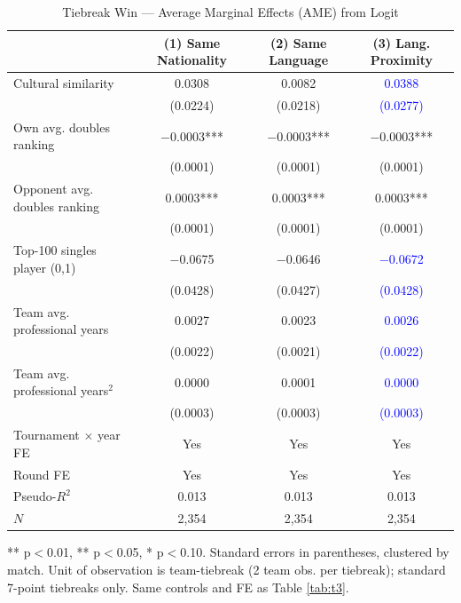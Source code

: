 \documentclass[10pt]{article}
\begin{document}
\begin{table}[htbp]
\color{blue}
\centering
\caption{Tiebreak Win — Average Marginal Effects (AME) from Logit \label{tab:t4}}
\begin{threeparttable}
\begin{tabular}{lccc}
\toprule
 & (1) Same Nationality & (2) Same Language & (3) Lang. Proximity \\
\midrule
Cultural similarity & 0.0308 & 0.0082 & \textcolor{blue}{0.0388} \\
 & (0.0224) & (0.0218) & \textcolor{blue}{(0.0277)} \\
Own avg. doubles ranking & $-$0.0003*** & $-$0.0003*** & $-$0.0003*** \\
 & (0.0001) & (0.0001) & (0.0001) \\
Opponent avg. doubles ranking & 0.0003*** & 0.0003*** & 0.0003*** \\
 & (0.0001) & (0.0001) & (0.0001) \\
Top-100 singles player (0,1) & $-$0.0675 & $-$0.0646 & \textcolor{blue}{$-$0.0672} \\
 & (0.0428) & (0.0427) & \textcolor{blue}{(0.0428)} \\
Team avg. professional years & 0.0027 & 0.0023 & \textcolor{blue}{0.0026} \\
 & (0.0022) & (0.0021) & \textcolor{blue}{(0.0022)} \\
Team avg. professional years$^2$ & 0.0000 & 0.0001 & \textcolor{blue}{0.0000} \\
 & (0.0003) & (0.0003) & \textcolor{blue}{(0.0003)} \\
\midrule
Tournament $\times$ year FE & Yes & Yes & Yes \\
Round FE & Yes & Yes & Yes \\
Pseudo-$R^2$ & 0.013 & 0.013 & 0.013 \\
$N$ & 2,354 & 2,354 & 2,354 \\
\bottomrule
\end{tabular}
\begin{tablenotes}
\small
\item *** p$<$0.01, ** p$<$0.05, * p$<$0.10. Standard errors in parentheses, clustered by match. Unit of observation is team-tiebreak (2 team obs. per tiebreak); standard 7-point tiebreaks only. Same controls and FE as Table \ref{tab:t3}.
\end{tablenotes}
\end{threeparttable}
\end{table}
\FloatBarrier
\end{document}
